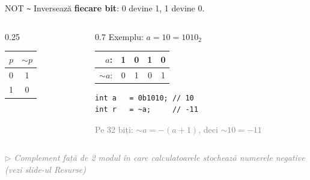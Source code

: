 ﻿\documentclass{beamer}
\newcommand{\beginnote}[1]{%
  \vfill
  {\footnotesize\textcolor{gray}{\textit{$\triangleright$ #1 (vezi slide-ul \emph{Resurse})}}}%
}
\begin{document}
\begin{frame}[fragile]{NOT \textemdash{} \texttt{\textasciitilde}}
  Inversează \textbf{fiecare bit}: 0 devine 1, 1 devine 0.
  \bigskip
  \begin{columns}[T]
    \begin{column}{0.25\textwidth}
      \begin{center}
      \begin{tabular}{cc}
        \toprule
        $p$ & $\sim p$ \\
        \midrule
        0 & 1 \\
        1 & 0 \\
        \bottomrule
      \end{tabular}
      \end{center}
    \end{column}
    \begin{column}{0.7\textwidth}
      Exemplu: $a = 10 = 1010_2$
      \begin{center}
      \begin{tabular}{rcccc}
        $a$:     & 1 & 0 & 1 & 0 \\
        \hline
        $\sim a$: & 0 & 1 & 0 & 1 \\
      \end{tabular}
      \end{center}
      \begin{center}
      \begin{lstlisting}
int a   = 0b1010; // 10
int r   = ~a;     // -11
      \end{lstlisting}
      \end{center}
      {\footnotesize\textcolor{gray}{Pe 32 biți: $\sim a = -(a+1)$, deci $\sim 10 = -11$}}
    \end{column}
  \end{columns}
  \beginnote{Complement față de 2 \textemdash{} modul în care calculatoarele stochează numerele negative}
\end{frame}
\end{document}
